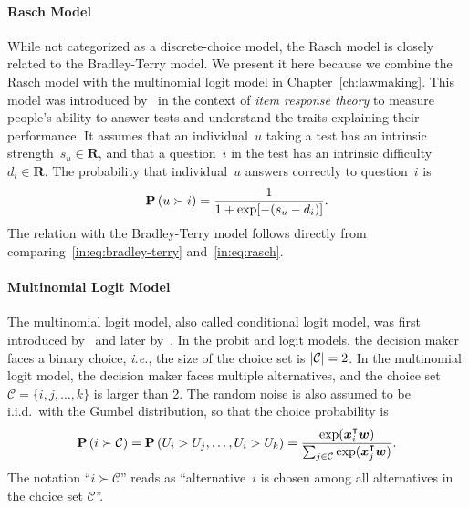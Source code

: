 \paragraph{Rasch Model}
While not categorized as a discrete-choice model, the Rasch model is closely related to the Bradley-Terry model.
We present it here because we combine the Rasch model with the multinomial logit model in Chapter~\ref{ch:lawmaking}.
This model was introduced by~\citet{rasch1993probabilistic} in the context of \emph{item response theory} to measure people's ability to answer tests and understand the traits explaining their performance.
It assumes that an individual~$u$ taking a test has an intrinsic strength~$s_u \in \mathbf{R}$, and that a question~$i$ in the test has an intrinsic difficulty~$d_i \in \mathbf{R}$.
The probability that individual~$u$ answers correctly to question~$i$ is
\begin{equation}
	\label{in:eq:rasch}
	\mathbf{P}\left( u \succ i \right) = \frac{1}{1 + \exp[-(s_u - d_i)]}.
\end{equation}
The relation with the Bradley-Terry model follows directly from comparing~\eqref{in:eq:bradley-terry} and~\eqref{in:eq:rasch}.

\paragraph{Multinomial Logit Model}

The multinomial logit model, also called conditional logit model, was first introduced by~\citet{luce1959individual} and later by~\citet{mcfadden1973conditional}.
In the probit and logit models, the decision maker faces a binary choice, \textit{i.e.}, the size of the choice set is $\lvert\mathcal{C}\rvert = 2$.
In the multinomial logit model, the decision maker faces multiple alternatives, and the choice set $\mathcal{C} = \{ i, j, \ldots, k \}$ is larger than 2.
The random noise is also assumed to be i.i.d.\ with the Gumbel distribution, so that the choice probability is
\begin{equation}
	\label{in:eq:multinomiallogit}
	\mathbf{P}\left( i \succ \mathcal{C} \right) = \mathbf{P}\left( U_i > U_j, \ldots, U_i > U_k \right) = \frac{\exp(\bm{x}_i^\intercal \bm{w})}{\sum_{j \in \mathcal{C}} \exp(\bm{x}_j^\intercal \bm{w})}.
\end{equation}
The notation ``$i \succ \mathcal{C}$'' reads as ``alternative~$i$ is chosen among all alternatives in the choice set $\mathcal{C}$''.

